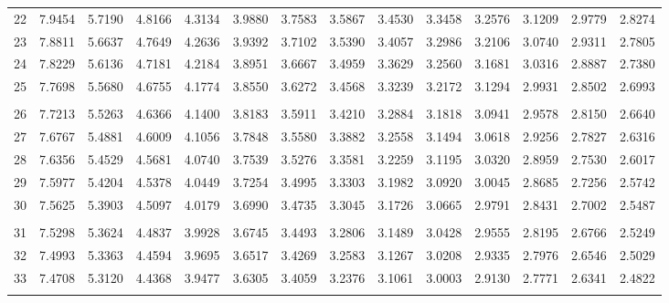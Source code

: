 {\begin{tabular}{l|lllllllllllll}
 22 & 7.9454 & 5.7190 & 4.8166 & 4.3134 & 3.9880 & 3.7583 & 3.5867 & 3.4530 & 3.3458 & 3.2576 & 3.1209 & 2.9779 & 2.8274 \\[5pt] \arrayrulecolor{light-gray}\hline\arrayrulecolor{black}  
 23 & 7.8811 & 5.6637 & 4.7649 & 4.2636 & 3.9392 & 3.7102 & 3.5390 & 3.4057 & 3.2986 & 3.2106 & 3.0740 & 2.9311 & 2.7805 \\[5pt] \arrayrulecolor{light-gray}\hline\arrayrulecolor{black}  
 24 & 7.8229 & 5.6136 & 4.7181 & 4.2184 & 3.8951 & 3.6667 & 3.4959 & 3.3629 & 3.2560 & 3.1681 & 3.0316 & 2.8887 & 2.7380 \\[5pt] \arrayrulecolor{light-gray}\hline\arrayrulecolor{black}  
 25 & 7.7698 & 5.5680 & 4.6755 & 4.1774 & 3.8550 & 3.6272 & 3.4568 & 3.3239 & 3.2172 & 3.1294 & 2.9931 & 2.8502 & 2.6993 \\[5pt] \arrayrulecolor{light-gray}\hline\arrayrulecolor{black}  
\\ 
 26 & 7.7213 & 5.5263 & 4.6366 & 4.1400 & 3.8183 & 3.5911 & 3.4210 & 3.2884 & 3.1818 & 3.0941 & 2.9578 & 2.8150 & 2.6640 \\[5pt] \arrayrulecolor{light-gray}\hline\arrayrulecolor{black}  
 27 & 7.6767 & 5.4881 & 4.6009 & 4.1056 & 3.7848 & 3.5580 & 3.3882 & 3.2558 & 3.1494 & 3.0618 & 2.9256 & 2.7827 & 2.6316 \\[5pt] \arrayrulecolor{light-gray}\hline\arrayrulecolor{black}  
 28 & 7.6356 & 5.4529 & 4.5681 & 4.0740 & 3.7539 & 3.5276 & 3.3581 & 3.2259 & 3.1195 & 3.0320 & 2.8959 & 2.7530 & 2.6017 \\[5pt] \arrayrulecolor{light-gray}\hline\arrayrulecolor{black}  
 29 & 7.5977 & 5.4204 & 4.5378 & 4.0449 & 3.7254 & 3.4995 & 3.3303 & 3.1982 & 3.0920 & 3.0045 & 2.8685 & 2.7256 & 2.5742 \\[5pt] \arrayrulecolor{light-gray}\hline\arrayrulecolor{black}  
 30 & 7.5625 & 5.3903 & 4.5097 & 4.0179 & 3.6990 & 3.4735 & 3.3045 & 3.1726 & 3.0665 & 2.9791 & 2.8431 & 2.7002 & 2.5487 \\[5pt] \arrayrulecolor{light-gray}\hline\arrayrulecolor{black}  
\\ 
 31 & 7.5298 & 5.3624 & 4.4837 & 3.9928 & 3.6745 & 3.4493 & 3.2806 & 3.1489 & 3.0428 & 2.9555 & 2.8195 & 2.6766 & 2.5249 \\[5pt] \arrayrulecolor{light-gray}\hline\arrayrulecolor{black}  
 32 & 7.4993 & 5.3363 & 4.4594 & 3.9695 & 3.6517 & 3.4269 & 3.2583 & 3.1267 & 3.0208 & 2.9335 & 2.7976 & 2.6546 & 2.5029 \\[5pt] \arrayrulecolor{light-gray}\hline\arrayrulecolor{black}  
 33 & 7.4708 & 5.3120 & 4.4368 & 3.9477 & 3.6305 & 3.4059 & 3.2376 & 3.1061 & 3.0003 & 2.9130 & 2.7771 & 2.6341 & 2.4822 \\[5pt] \arrayrulecolor{light-gray}\hline\arrayrulecolor{black}  

\end{tabular}}

